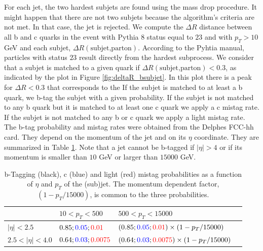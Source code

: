 For each jet, the two hardest subjets are found using the mass drop procedure. It might happen that there are not two subjets because the algorithm's criteria are not met. In that case, the jet is rejected. We compute the $\Delta R$ distance between all b and c quarks in the event with Pythia 8 status equal to $23$ and with $p_T>10$ GeV and each subjet, $\Delta R(\text{subjet,parton})$. According to the Pyhtia manual, particles with status $23$ result directly from the hardest subprocess. We consider that a subjet is matched to a given quark if $\Delta R(\text{subjet,parton})<0.3$, as indicated by the plot in Figure \ref{fig:deltaR_bsubjet}. In this plot there is a peak for $\Delta R<0.3$ that corresponds to the  If the subjet is matched to at least a b quark, we b-tag the subjet with a given probability. If the subjet is not matched to any b quark but it is matched to at least one c quark we apply a c mistag rate. If the subjet is not matched to any b or c quark we apply a light mistag rate. The b-tag probability and mistag rates were obtained from the Delphes FCC-hh card. They depend on the momentum of the jet and on its $\eta$ coordinate. They are summarized in Table \ref{table:btag}. Note that a jet cannot be b-tagged if $|\eta|>4$ or if its momentum is smaller than $10$ GeV or larger than $15000$ GeV. 



\begin{table}
	\centering
	\begin{tabular}{llll}
		\toprule 
		\backslashbox{$\eta$}{$p_T$} & $10<p_T<500$ & $500<p_T<15000$ &  \\
		\midrule
		$|\eta|<2.5$ & $0.85;\textcolor{blue}{0.05};\textcolor{red}{0.01} $ & $(0.85;\textcolor{blue}{0.05};\textcolor{red}{0.01})\times\left(1-p_T/15000\right)$ &   \\
		\rowcolor{black!7} $2.5<|\eta|<4.0$ & $0.64;\textcolor{blue}{0.03};\textcolor{red}{0.0075}$ & $(0.64;\textcolor{blue}{0.03};\textcolor{red}{0.0075})\times\left(1-p_T/15000\right)$ &  \\
		\bottomrule
	\end{tabular}
	\caption{b-Tagging (black), c (blue) and light (red) mistag probabilities as a function of $\eta$ and $p_T$ of the (sub)jet. The momentum dependent factor, $\left(1-p_T/15000\right)$, is common to the three probabilities.}
	\label{table:btag}
\end{table}

